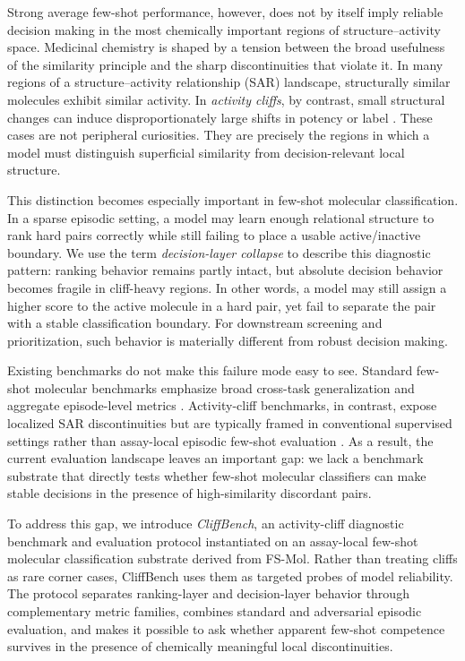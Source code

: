 \documentclass{article}
\begin{document}
Strong average few-shot performance, however, does not by itself imply reliable decision making in the most
chemically important regions of structure--activity space. Medicinal chemistry is shaped by a tension between the
broad usefulness of the similarity principle and the sharp discontinuities that violate it. In many regions of a
structure--activity relationship (SAR) landscape, structurally similar molecules exhibit similar activity. In
\emph{activity cliffs}, by contrast, small structural changes can induce disproportionately large shifts in
potency or label \cite{activity_cliffs_review,moleculeace}. These cases are not peripheral curiosities. They are
precisely the regions in which a model must distinguish superficial similarity from decision-relevant local
structure.

This distinction becomes especially important in few-shot molecular classification. In a sparse episodic setting,
a model may learn enough relational structure to rank hard pairs correctly while still failing to place a usable
active/inactive boundary. We use the term \emph{decision-layer collapse} to describe this diagnostic pattern:
ranking behavior remains partly intact, but absolute decision behavior becomes fragile in cliff-heavy regions. In
other words, a model may still assign a higher score to the active molecule in a hard pair, yet fail to separate
the pair with a stable classification boundary. For downstream screening and prioritization, such behavior is
materially different from robust decision making.

Existing benchmarks do not make this failure mode easy to see. Standard few-shot molecular benchmarks emphasize
broad cross-task generalization and aggregate episode-level metrics \cite{fsmol}. Activity-cliff benchmarks, in
contrast, expose localized SAR discontinuities but are typically framed in conventional supervised settings rather
than assay-local episodic few-shot evaluation \cite{moleculeace}. As a result, the current evaluation landscape
leaves an important gap: we lack a benchmark substrate that directly tests whether few-shot molecular classifiers
can make stable decisions in the presence of high-similarity discordant pairs.

To address this gap, we introduce \emph{CliffBench}, an activity-cliff diagnostic benchmark and evaluation
protocol instantiated on an assay-local few-shot molecular classification substrate derived from FS-Mol. Rather
than treating cliffs as rare corner cases, CliffBench uses them as targeted probes of model reliability. The
protocol separates ranking-layer and decision-layer behavior through complementary metric families, combines
standard and adversarial episodic evaluation, and makes it possible to ask whether apparent few-shot competence
survives in the presence of chemically meaningful local discontinuities.
\end{document}
